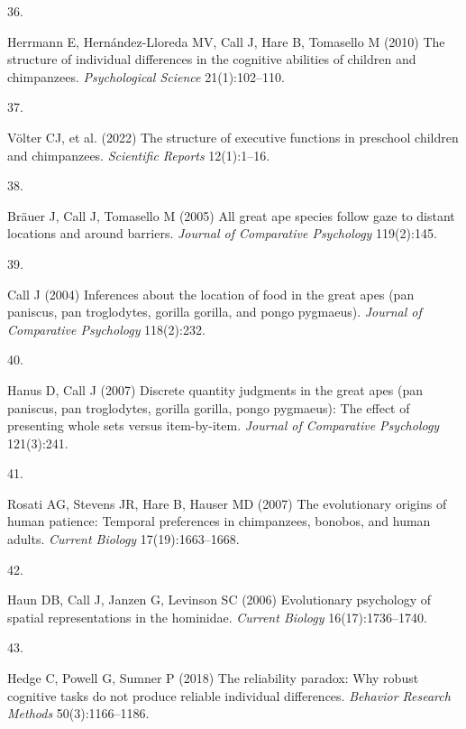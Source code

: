 \documentclass[
  man,floatsintext]{apa6}
\newlength{\cslhangindent}
\newlength{\csllabelwidth}
\newlength{\cslentryspacingunit} %
\newenvironment{CSLReferences}[2] %
 {%
  \setlength{\parindent}{0pt}
  \ifodd #1
  \let\oldpar\par
  \def\par{\hangindent=\cslhangindent\oldpar}
  \fi
  \setlength{\parskip}{#2\cslentryspacingunit}
 }%
 {}
\newcommand{\CSLLeftMargin}[1]{\parbox[t]{\csllabelwidth}{#1}}
\newcommand{\CSLRightInline}[1]{\parbox[t]{\linewidth - \csllabelwidth}{#1}\break}
\begin{document}
\begin{CSLReferences}{0}{0}
\leavevmode{}%
\CSLLeftMargin{36. }%
\CSLRightInline{Herrmann E, Hernández-Lloreda MV, Call J, Hare B, Tomasello M (2010) The structure of individual differences in the cognitive abilities of children and chimpanzees. \emph{Psychological Science} 21(1):102--110.}

\leavevmode{}%
\CSLLeftMargin{37. }%
\CSLRightInline{Völter CJ, et al. (2022) The structure of executive functions in preschool children and chimpanzees. \emph{Scientific Reports} 12(1):1--16.}

\leavevmode{}%
\CSLLeftMargin{38. }%
\CSLRightInline{Bräuer J, Call J, Tomasello M (2005) All great ape species follow gaze to distant locations and around barriers. \emph{Journal of Comparative Psychology} 119(2):145.}

\leavevmode{}%
\CSLLeftMargin{39. }%
\CSLRightInline{Call J (2004) Inferences about the location of food in the great apes (pan paniscus, pan troglodytes, gorilla gorilla, and pongo pygmaeus). \emph{Journal of Comparative Psychology} 118(2):232.}

\leavevmode{}%
\CSLLeftMargin{40. }%
\CSLRightInline{Hanus D, Call J (2007) Discrete quantity judgments in the great apes (pan paniscus, pan troglodytes, gorilla gorilla, pongo pygmaeus): The effect of presenting whole sets versus item-by-item. \emph{Journal of Comparative Psychology} 121(3):241.}

\leavevmode{}%
\CSLLeftMargin{41. }%
\CSLRightInline{Rosati AG, Stevens JR, Hare B, Hauser MD (2007) The evolutionary origins of human patience: Temporal preferences in chimpanzees, bonobos, and human adults. \emph{Current Biology} 17(19):1663--1668.}

\leavevmode{}%
\CSLLeftMargin{42. }%
\CSLRightInline{Haun DB, Call J, Janzen G, Levinson SC (2006) Evolutionary psychology of spatial representations in the hominidae. \emph{Current Biology} 16(17):1736--1740.}

\leavevmode{}%
\CSLLeftMargin{43. }%
\CSLRightInline{Hedge C, Powell G, Sumner P (2018) The reliability paradox: Why robust cognitive tasks do not produce reliable individual differences. \emph{Behavior Research Methods} 50(3):1166--1186.}


\end{CSLReferences}
\end{document}

